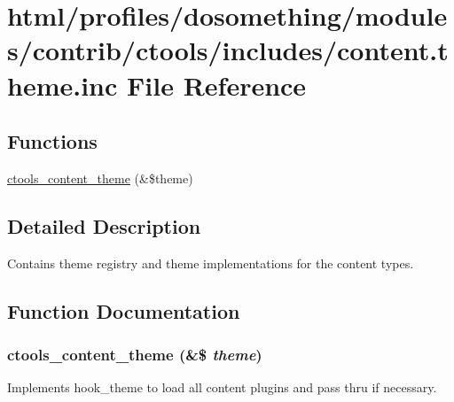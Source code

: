 \hypertarget{content_8theme_8inc}{
\section{html/profiles/dosomething/modules/contrib/ctools/includes/content.theme.inc File Reference}
\label{content_8theme_8inc}
}
\subsection*{Functions}
\begin{DoxyCompactItemize}
\item 
\hyperlink{content_8theme_8inc_acdc89d00a242b870841d8a61544008d2}{ctools\_\-content\_\-theme} (\&\$theme)
\end{DoxyCompactItemize}


\subsection{Detailed Description}
Contains theme registry and theme implementations for the content types. 

\subsection{Function Documentation}
\hypertarget{content_8theme_8inc_acdc89d00a242b870841d8a61544008d2}{
\subsubsection[{ctools\_\-content\_\-theme}]{\setlength{\rightskip}{0pt plus 5cm}ctools\_\-content\_\-theme (\&\$ {\em theme})}}
\label{content_8theme_8inc_acdc89d00a242b870841d8a61544008d2}
Implements hook\_\-theme to load all content plugins and pass thru if necessary. 
